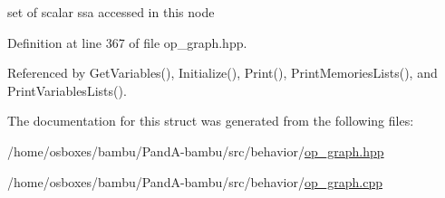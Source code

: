 set of scalar ssa accessed in this node 



Definition at line 367 of file op\+\_\+graph.\+hpp.



Referenced by Get\+Variables(), Initialize(), Print(), Print\+Memories\+Lists(), and Print\+Variables\+Lists().



The documentation for this struct was generated from the following files\+:\begin{DoxyCompactItemize}
\item 
/home/osboxes/bambu/\+Pand\+A-\/bambu/src/behavior/\hyperlink{op__graph_8hpp}{op\+\_\+graph.\+hpp}\item 
/home/osboxes/bambu/\+Pand\+A-\/bambu/src/behavior/\hyperlink{op__graph_8cpp}{op\+\_\+graph.\+cpp}\end{DoxyCompactItemize}
